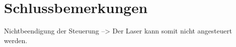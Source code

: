 \section{Schlussbemerkungen}
Nichtbeendigung der Steuerung --> Der Laser kann somit nicht angesteuert werden.